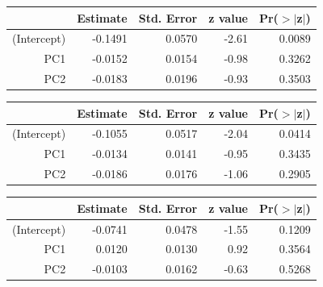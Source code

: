 \documentclass[a4paper,12pt]{Latex/Classes/PhDthesisPSnPDF}
\begin{document}
\begin{center}
\begin{table}[ht]
\centering
\begin{tabular}{rrrrr}
  \hline
 & Estimate & Std. Error & z value & Pr($>$$|$z$|$) \\ 
  \hline
(Intercept) & -0.1491 & 0.0570 & -2.61 & 0.0089 \\ 
  PC1 & -0.0152 & 0.0154 & -0.98 & 0.3262 \\ 
  PC2 & -0.0183 & 0.0196 & -0.93 & 0.3503 \\ 
   \hline
\end{tabular}
\end{table}\end{center}
\begin{center}
\begin{table}[ht]
\centering
\begin{tabular}{rrrrr}
  \hline
 & Estimate & Std. Error & z value & Pr($>$$|$z$|$) \\ 
  \hline
(Intercept) & -0.1055 & 0.0517 & -2.04 & 0.0414 \\ 
  PC1 & -0.0134 & 0.0141 & -0.95 & 0.3435 \\ 
  PC2 & -0.0186 & 0.0176 & -1.06 & 0.2905 \\ 
   \hline
\end{tabular}
\end{table}\end{center}

\newpage

\begin{center}
\begin{table}[ht]
\centering
\begin{tabular}{rrrrr}
  \hline
 & Estimate & Std. Error & z value & Pr($>$$|$z$|$) \\ 
  \hline
(Intercept) & -0.0741 & 0.0478 & -1.55 & 0.1209 \\ 
  PC1 & 0.0120 & 0.0130 & 0.92 & 0.3564 \\ 
  PC2 & -0.0103 & 0.0162 & -0.63 & 0.5268 \\ 
   \hline
\end{tabular}
\end{table}\end{center}
\end{document}
